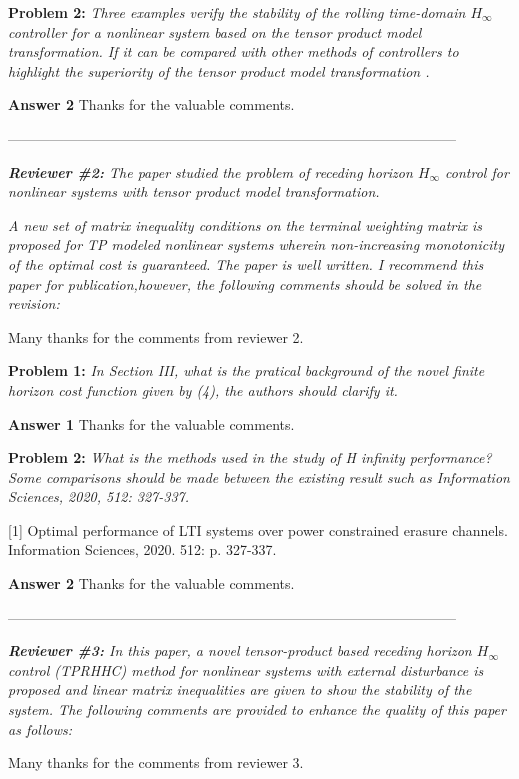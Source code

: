 \documentclass[a4paper]{article}
\begin{document}
\textbf{Problem 2:} \textit{Three examples verify the stability of the rolling time-domain $H_{\infty}$ controller for a nonlinear system based on the tensor product model transformation. If it can be compared with other methods of controllers to highlight the superiority of the tensor product model transformation .}

\textbf{Answer 2} Thanks for the valuable comments.

------------------------------------------------------------------------------------------------

\textit{\textbf{Reviewer \#2:} The paper studied the problem of receding horizon $H_{\infty}$ control for nonlinear systems with tensor product model transformation. }

\textit{A new set of matrix inequality conditions on the terminal weighting matrix is proposed for TP modeled nonlinear systems wherein non-increasing monotonicity of the optimal cost is guaranteed. The paper is well written. I recommend this paper for publication,however, the following comments should be solved in the revision: }

Many thanks for the comments from reviewer 2.

\textbf{Problem 1:} \textit{In Section III, what is the pratical background of the novel finite horizon cost function given by (4), the authors should clarify it.}

\textbf{Answer 1} Thanks for the valuable comments.

\textbf{Problem 2:} \textit{What is the methods used in the study of H infinity performance? Some comparisons should be made between the existing result such as Information Sciences, 2020, 512: 327-337.}


[1] Optimal performance of LTI systems over power constrained erasure channels. Information Sciences, 2020. 512: p. 327-337.


\textbf{Answer 2} Thanks for the valuable comments.

------------------------------------------------------------------------------------------------

\textit{\textbf{Reviewer \#3:}  In this paper, a novel tensor-product based receding horizon $H_{\infty}$ control (TPRHHC) method for nonlinear systems with external disturbance is proposed and linear matrix inequalities are given to show the stability of the system. The following comments are provided to enhance the quality of this paper as follows:}

Many thanks for the comments from reviewer 3.
\end{document}
